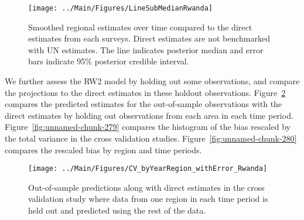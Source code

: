 \documentclass[12pt]{article}\usepackage[]{graphicx}\usepackage[]{color}
\newenvironment{knitrout}{}{} %
\begin{document}
\begin{knitrout}
\color{fgcolor}\begin{figure}[bht]

{\centering \texttt{[image: ../Main/Figures/LineSubMedianRwanda]} 

}

\caption[Smoothed regional estimates over time compared to the direct estimates from each surveys]{Smoothed regional estimates over time compared to the direct estimates from each surveys. Direct estimates are not benchmarked with UN estimates. The line indicates posterior median and error bars indicate 95\% posterior credible interval.}\label{fig:unnamed-chunk-277}
\end{figure}


\end{knitrout}
We further assess the RW2 model by holding out some observations, and compare the projections to the direct estimates in these holdout observations. Figure~\ref{fig:unnamed-chunk-278} compares the predicted estimates for the out-of-sample observations  with the direct estimates by holding out observations from each area in each time period.  Figure~\ref{fig:unnamed-chunk-279} compares the histogram of the bias rescaled by the total variance in the cross validation studies. Figure~\ref{fig:unnamed-chunk-280} compares the rescaled bias by region and time periods.



 
\begin{knitrout}
\color{fgcolor}\begin{figure}[bht]

{\centering \texttt{[image: ../Main/Figures/CV\_byYearRegion\_withError\_Rwanda]} 

}

\caption[Out-of-sample predictions along with direct estimates in the cross validation study where data from one region in each time period is held out and predicted using the rest of the data]{Out-of-sample predictions along with direct estimates in the cross validation study where data from one region in each time period is held out and predicted using the rest of the data.}\label{fig:unnamed-chunk-278}
\end{figure}


\end{knitrout}
\end{document}
